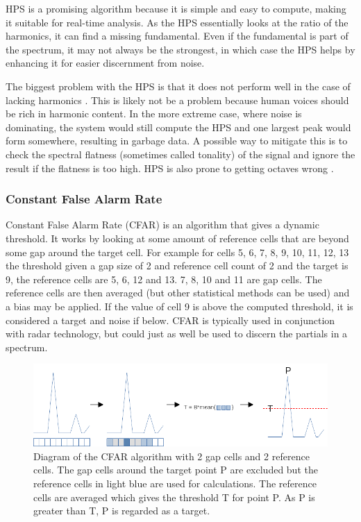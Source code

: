 HPS is a promising algorithm because it is simple and easy to compute, making it suitable for real-time analysis. As the HPS essentially looks at the ratio of the harmonics, it can find a missing fundamental. Even if the fundamental is part of the spectrum, it may not always be the strongest, in which case the HPS helps by enhancing it for easier discernment from noise.

The biggest problem with the HPS is that it does not perform well in the case of lacking harmonics \cite{McLeod2008}. This is likely not be a problem because human voices should be rich in harmonic content. In the more extreme case, where noise is dominating, the system would still compute the HPS and one largest peak would form somewhere, resulting in garbage data. A possible way to mitigate this is to check the spectral flatness (sometimes called tonality) of the signal and ignore the result if the flatness is too high. HPS is also prone to getting octaves wrong \cite{Smyth2019}.
\subsubsection{Constant False Alarm Rate}
Constant False Alarm Rate (CFAR) is an algorithm that gives a dynamic threshold. It works by looking at some amount of reference cells that are beyond some gap around the target cell. For example for cells 5, 6, 7, 8, 9, 10, 11, 12, 13 the threshold given a gap size of 2 and reference cell count of 2 and the target is 9, the reference cells are 5, 6, 12 and 13. 7, 8, 10 and 11 are gap cells. The reference cells are then averaged (but other statistical methods can be used) and a bias may be applied. If the value of cell 9 is above the computed threshold, it is considered a target and noise if below. CFAR is typically used in conjunction with radar technology, but could just as well be used to discern the partials in a spectrum. 

\begin{figure}[ht]
    \centering
    \includegraphics[width=\textwidth]{./images/cfar.png}
    \caption{Diagram of the CFAR algorithm with 2 gap cells and 2 reference cells. The gap cells around the target point P are excluded but the reference cells in light blue are used for calculations. The reference cells are averaged which gives the threshold T for point P. As P is greater than T, P is regarded as a target.\label{fig:cfar}}
\end{figure}


